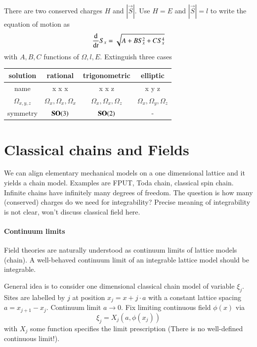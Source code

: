 There are two conserved charges $H$ and $|\vec{S}|$. Use $H = E$ and $|\vec{S}|=l$ to write the equation of motion as 
\begin{equation*}
	\dv{t} S_x = \sqrt{A + B S_x^2 + C S_x^4}
\end{equation*}
with $A, B, C$ functions of $\Omega, l , E$. Extinguish three cases
\begin{table}[ht]
	\centering
	\label{tab:label}
	\begin{tabular}{c c c c}
	\toprule
	solution & rational & trigonometric & elliptic \\
	\midrule
	name & x x x & x x z & x y z \\
	$\Omega_{x, y, z}$ & $\Omega_x, \Omega_x, \Omega_x$ & $\Omega_{x}, \Omega_x, \Omega_z$ & $\Omega_x, \Omega_y, \Omega_z$ \\
	symmetry & $\mathbf{SO}(3)$ & $\mathbf{SO}(2)$ & - \\
	\bottomrule
	\end{tabular}
\end{table}

\section{Classical chains and Fields}
We can align elementary mechanical models on a one dimensional lattice and it yields a chain model. Examples are FPUT, Toda chain, classical spin chain. Infinite chains have infinitely many degrees of freedom. The question is how many (conserved) charges do we need for integrability? Precise meaning of integrability is not clear, won't discuss classical field here.

\paragraph{Continuum limits} 
Field theories are naturally understood as continuum limits of lattice models (chain). A well-behaved continuum limit of an integrable lattice model should be integrable.

General idea is to consider one dimensional classical chain model of variable $\xi_j$. Sites are labelled by $j$ at position $x_j = x + j\cdot a$ with a constant lattice spacing $a = x_{j+1}  - x_j$. Continuum limit $a\rightarrow 0$. Fix limiting continuous field $\phi(x)$ via 
\begin{equation*}
	\xi_j = X_j (a, \phi(x_j))
\end{equation*}
with $X_j$ some function specifies the limit prescription (There is no well-defined continuous limit!).

